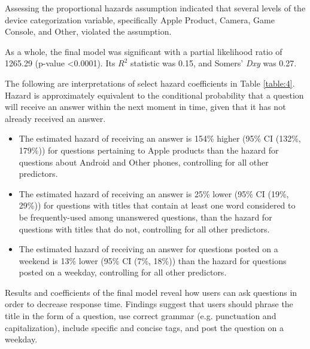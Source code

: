 \documentclass[]{interact}\usepackage[]{graphicx}\usepackage[]{color}
\begin{document}
{Assessing the proportional hazards assumption indicated that several levels of the device categorization variable, specifically Apple Product, Camera, Game Console, and Other, violated the assumption. 

As a whole, the final model was significant with a partial likelihood ratio of 1265.29 (p-value \textless0.0001). Its $R^2$ statistic was 0.15, and Somers' \textit{Dxy} was 0.27. 

The following are interpretations of select hazard coefficients in Table \ref{table:4}. Hazard is approximately equivalent to the conditional probability that a question will receive an answer within the next moment in time, given that it has not already received an answer. 




\begin{itemize}
  \item The estimated hazard of receiving an answer is 154\% higher (95\% CI (132\%, 179\%)) for questions pertaining to Apple products than the hazard for questions about Android and Other phones, controlling for all other predictors.
  \item The estimated hazard of receiving an answer is 25\% lower (95\% CI (19\%, 29\%)) for questions with titles that contain at least one word considered to be frequently-used among unanswered questions, than the hazard for questions with titles that do not, controlling for all other predictors. 
  \item The estimated hazard of receiving an answer for questions posted on a weekend is 13\% lower (95\% CI (7\%, 18\%)) than the hazard for questions posted on a weekday, controlling for all other predictors.
\end{itemize}

Results and coefficients of the final model reveal how users can ask questions in order to decrease response time. Findings suggest that users should phrase the title in the form of a question, use correct grammar (e.g. punctuation and capitalization), include specific and concise tags, and post the question on a weekday. 

}
\end{document}
